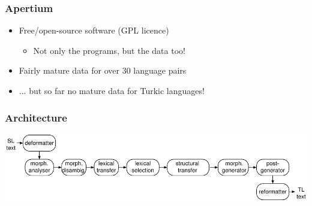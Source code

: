 \documentclass[10pt,xetex]{beamer} %
\begin{document}
\begin{frame}
  \frametitle{Apertium}

\begin{block}{}

\begin{itemize}
  \item Free/open-source software (GPL licence)
  \begin{itemize}
    \item Not only the programs, but the data too!
  \end{itemize}
  \item Fairly mature data for over 30 language pairs
  \item ... but so far no mature data for Turkic languages!
\end{itemize}

\end{block}

\end{frame}

\begin{frame}
  \frametitle{Architecture}

\includegraphics[width=\textwidth]{../architecture.pdf}

\end{frame}
\end{document}
